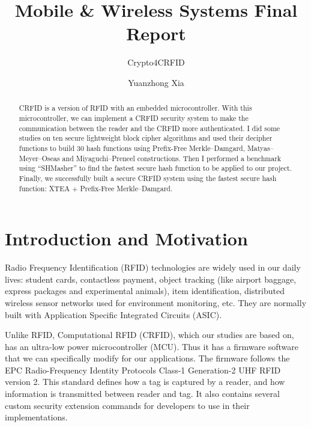 \documentclass[sigconf, review=false]{acmart}
\let\OldTexttrademark\texttrademark
\renewcommand{\texttrademark}{\OldTexttrademark\xspace}%
\begin{document}
\title{Mobile \& Wireless Systems Final Report}
\subtitle{Crypto4CRFID}

\author{Yuanzhong Xia}

\begin{abstract}
    CRFID is a version of RFID with an embedded microcontroller.
    With this microcontroller, we can implement a CRFID security system to make the communication between the reader and the CRFID more authenticated.
    I did some studies on ten secure lightweight block cipher algorithms and used their decipher functions to build 30 hash functions
    using Prefix-Free Merkle--Damgard, Matyas--Meyer--Oseas and Miyaguchi--Preneel constructions.
    Then I performed a benchmark using ``SHMasher'' to find the fastest secure hash function to be applied to our project.
    Finally, we successfully built a secure CRFID system using the fastest secure hash function: XTEA + Prefix-Free Merkle--Damgard.
\end{abstract}
\maketitle



\section{Introduction and Motivation}
Radio Frequency Identification (RFID) technologies are widely used in our daily lives:
student cards, contactless payment, object tracking (like airport baggage, express packages and experimental animals),
item identification, distributed wireless sensor networks used for environment monitoring, etc. \cite{wikipedia2017rfid}
They are normally built with Application Specific Integrated Circuits (ASIC).

Unlike RFID, Computational RFID (CRFID), which our studies are based on, has an ultra-low power microcontroller (MCU).
Thus it has a firmware software that we can specifically modify for our applications.
The firmware follows the EPC\texttrademark Radio-Frequency Identity Protocols Class-1 Generation-2 UHF RFID version 2\cite{epcglobal2013}.
This standard defines how a tag is captured by a reader, and how information is transmitted between reader and tag.
It also contains several custom security extension commands for developers to use in their implementations.
\end{document}
